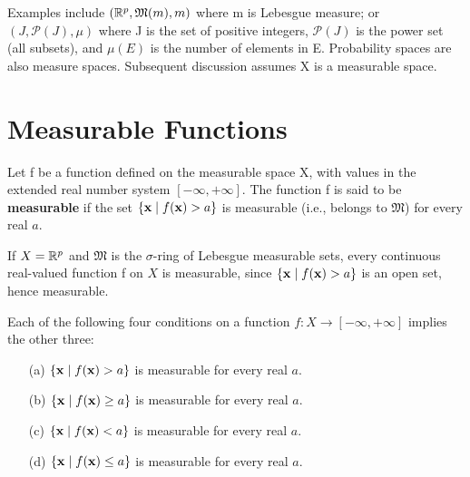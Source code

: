 \begin{remark}
  \label{rem:chap11:measure_space_examples}
  Examples include $(\mathbb{R}^p, \mathfrak{M}(m), m)$ where m is Lebesgue
  measure; or $(J, \mathcal{P}(J), \mu)$ where J is the set of
  positive integers, $\mathcal{P}(J)$ is the power set (all subsets),
  and $\mu(E)$ is the number of elements in E. Probability spaces are
  also measure spaces. Subsequent discussion assumes X is a measurable space.
\end{remark}

\section{Measurable Functions}

\begin{definition}
  \label{def:chap11:measurable_function}
  Let f be a function defined on the measurable space X, with values
  in the extended real number system $[-\infty, +\infty]$. The
  function f is said to be \textbf{measurable} if the set $\{
  \mathbf{x} \mid f(\mathbf{x}) > a \}$ is measurable (i.e., belongs to
  $\mathfrak{M}$) for every real $a$.
\end{definition}

\begin{example}
  \label{ex:chap11:continuous_implies_measurable}
  If $X = \mathbb{R}^p$ and $\mathfrak{M}$ is the $\sigma$-ring of Lebesgue
  measurable sets, every continuous real-valued function f on $X$ is
  measurable, since $\{ \mathbf{x} \mid f(\mathbf{x}) > a \}$ is an open
  set, hence measurable.
\end{example}

\begin{theorem}
  \label{thm:chap11:measurable_equivalences}
  Each of the following four conditions on a function $f: X \to
  [-\infty, +\infty]$ implies the other three:
  \begin{itemize}
    \item[(a)] $\{ \mathbf{x} \mid f(\mathbf{x}) > a \}$ is measurable
      for every real $a$.
    \item[(b)] $\{ \mathbf{x} \mid f(\mathbf{x}) \ge a \}$ is measurable
      for every real $a$.
    \item[(c)] $\{ \mathbf{x} \mid f(\mathbf{x}) < a \}$ is measurable
      for every real $a$.
    \item[(d)] $\{ \mathbf{x} \mid f(\mathbf{x}) \le a \}$ is measurable
      for every real $a$.
  \end{itemize}
\end{theorem}

